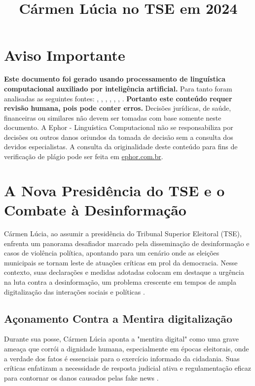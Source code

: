 \documentclass[
   article,       
   12pt,          
   oneside,       
   a4paper,       
   english,       
   brazil,        
   sumario=tradicional
   ]{abntex2}
\begin{document}
\frenchspacing 
\maketitle

\textual
\section{Aviso Importante}
\textbf{Este documento foi gerado usando processamento de linguística computacional auxiliado por inteligência artificial.} Para tanto foram analisadas as seguintes fontes:  \cite{As_duas_preocupacoes_que_rondam_Carmen_Lucia_}, \cite{Carmen_Lucia_tem_de_afastar_TSE_da_polarizaca}, \cite{Carmen_Lucia_toma_posse_na_presidencia_do_TSE}, \cite{Contra_o_virus_da_mentira_ha_o_remedio_da_inf}, \cite{Mendonca_e_o_unico_ministro_do_STF_a_faltar_a}, \cite{Pacheco_participa_da_posse_na_Carmen_Lucia_na}, \cite{Quem_centraliza_poderes_em_uma_pessoa_chamase}.
\textbf{Portanto este conteúdo requer revisão humana, pois pode conter erros.} Decisões jurídicas, de saúde, financeiras ou similares não devem ser tomadas com base somente neste documento. A Ephor - Linguística Computacional não se responsabiliza por decisões ou outros danos oriundos da tomada de decisão sem a consulta dos devidos especialistas.
A consulta da originalidade deste conteúdo para fins de verificação de plágio pode ser feita em \href{http://www.ephor.com.br}{ephor.com.br}.
\title{Cármen Lúcia no TSE em 2024}

\section{A Nova Presidência do TSE e o Combate à Desinformação}
Cármen Lúcia, ao assumir a presidência do Tribunal Superior Eleitoral (TSE), enfrenta um panorama desafiador marcado pela disseminação de desinformação e casos de violência política, apontando para um cenário onde as eleições municipais se tornam leste de atuações críticas em prol da democracia. Nesse contexto, suas declarações e medidas adotadas colocam em destaque a urgência na luta contra a desinformação, um problema crescente em tempos de ampla digitalização das interações sociais e políticas \cite{Carmen_Lucia_toma_posse_na_presidencia_do_TSE}.

\subsection{Açonamento Contra a Mentira digitalização}
Durante sua posse, Cármen Lúcia aponta a "mentira digital" como uma grave ameaça que corrói a dignidade humana, especialmente em épocas eleitorais, onde a verdade dos fatos é essenciais para o exercício informado da cidadania. Suas críticas enfatizam a necessidade de resposta judicial ativa e regulamentação eficaz para contornar os danos causados pelas fake news \cite{Contra_o_virus_da_mentira_ha_o_remedio_da_inf}.
\end{document}
